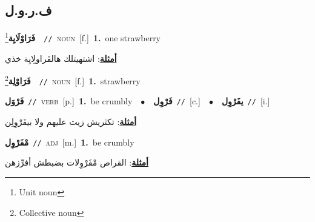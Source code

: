 \documentclass[10pt,a4paper,twoside]{article} %
\begin{document}
\begin{multicols}{2}
\vspace{-3mm}
\subsection*{\color{blue}\foreignlanguage{arabic}{ف.ر.و.ل}\color{blue}{}} 

{\setlength\topsep{0pt}\textbf{\foreignlanguage{arabic}{فَرَاوْلَايِة}}\footnote{Unit noun}\ \ {\color{gray}\texttt{//}\color{black}}\ \textsc{noun}\ [f.]\ \textbf{1.}~one strawberry\  \begin{flushright}\color{gray}\foreignlanguage{arabic}{\textbf{\underline{\foreignlanguage{arabic}{أمثلة}}}: اشتهيتلك هالفَراولِايِة خذي}\end{flushright}\color{black}} \vspace{2mm}

{\setlength\topsep{0pt}\textbf{\foreignlanguage{arabic}{فَرَاوْلِة}}\footnote{Collective noun}\ \ {\color{gray}\texttt{//}\color{black}}\ \textsc{noun}\ [f.]\ \textbf{1.}~strawberry\ } \vspace{2mm}

{\setlength\topsep{0pt}\textbf{\foreignlanguage{arabic}{فَرْوَل}}\ {\color{gray}\texttt{//}\color{black}}\ \textsc{verb}\ [p.]\ \textbf{1.}~be crumbly\ \ $\bullet$\ \ \setlength\topsep{0pt}\textbf{\foreignlanguage{arabic}{فَرْوِل}}\ {\color{gray}\texttt{//}\color{black}}\ [c.]\ \ $\bullet$\ \ \setlength\topsep{0pt}\textbf{\foreignlanguage{arabic}{يفَرْوِل}}\ {\color{gray}\texttt{//}\color{black}}\ [i.]\  \begin{flushright}\color{gray}\foreignlanguage{arabic}{\textbf{\underline{\foreignlanguage{arabic}{أمثلة}}}: تكثريش زيت عليهم ولا بيفَرْوِلِن}\end{flushright}\color{black}} \vspace{2mm}

{\setlength\topsep{0pt}\textbf{\foreignlanguage{arabic}{مْفَرْوِل}}\ {\color{gray}\texttt{//}\color{black}}\ \textsc{adj}\ [m.]\ \textbf{1.}~be crumbly\  \begin{flushright}\color{gray}\foreignlanguage{arabic}{\textbf{\underline{\foreignlanguage{arabic}{أمثلة}}}: القراص مْفَرْوِلات بضبطش أفرِّزهن}\end{flushright}\color{black}} \vspace{2mm}


\end{multicols}
\end{document}
